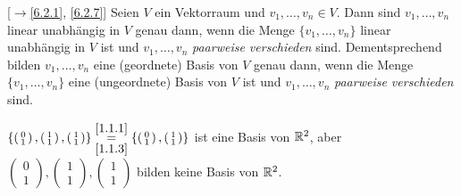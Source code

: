 \documentclass[../../main.tex]{subfiles}
\begin{document}
\begin{warning}\mbox{}[$\to$\ref{6.2.1}, \ref{6.2.7}] \label{6.2.9}
Seien $V$ ein Vektorraum und $v_1,\dots,v_n\in V$. Dann sind $v_1,\dots,v_n$ linear unabhängig in $V$ genau dann,
wenn die Menge $\{v_1,\dots,v_n\}$ linear unabhängig in $V$ ist und $v_1,\dots,v_n$ \emph{paarweise verschieden} sind. Dementsprechend bilden
$v_1,\dots,v_n$ eine (geordnete) Basis von $V$ genau dann, wenn die Menge $\{v_1,\dots,v_n\}$ eine (ungeordnete) Basis von $V$ ist
und $v_1,\dots,v_n$ \emph{paarweise verschieden} sind.
\end{warning}

\begin{bsp}\label{6.2.10}
$\left\{\left(\begin{smallmatrix}0\\1\end{smallmatrix}\right),\left(\begin{smallmatrix}1\\1\end{smallmatrix}\right),\left(\begin{smallmatrix}1\\1\end{smallmatrix}\right)\right\}
\overset{\ref{1.1.1}}{\underset{\ref{1.1.3}}=}\left\{\left(\begin{smallmatrix}0\\1\end{smallmatrix}\right),\left(\begin{smallmatrix}1\\1\end{smallmatrix}\right)\right\}$ ist eine Basis
von $\mathbb R^2$, aber $\left(\begin{smallmatrix}0\\1\end{smallmatrix}\right),\left(\begin{smallmatrix}1\\1\end{smallmatrix}\right),\left(\begin{smallmatrix}1\\1\end{smallmatrix}\right)$
bilden keine Basis von $\mathbb R^2$.
\end{bsp}
\end{document}
